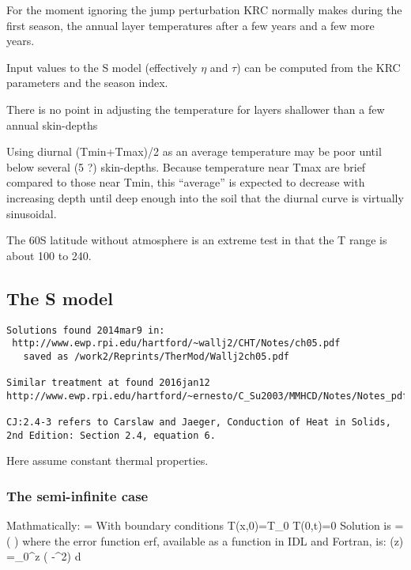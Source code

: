 For the moment ignoring the jump perturbation KRC normally makes during the
first season, the annual layer temperatures after a few years and a few more
years.

Input values to the S model (effectively $\eta$ and $\tau$) can be computed
from the KRC parameters and the season index.

 
There is no point in adjusting the temperature for layers shallower than a few annual skin-depths 

Using diurnal (Tmin+Tmax)/2 as an average temperature may be poor until below
several (5 ?) skin-depths. Because temperature near Tmax are brief compared to
those near Tmin, this ``average'' is expected to decrease with increasing depth
until deep enough into the soil that the diurnal curve is virtually sinusoidal.


The 60S latitude without atmosphere is an extreme test in that the T range is about 100 to 240.



\subsection{The S model}

\vspace{-3.mm} 
\begin{verbatim}
Solutions found 2014mar9 in: 
 http://www.ewp.rpi.edu/hartford/~wallj2/CHT/Notes/ch05.pdf
   saved as /work2/Reprints/TherMod/Wallj2ch05.pdf

Similar treatment at found 2016jan12
http://www.ewp.rpi.edu/hartford/~ernesto/C_Su2003/MMHCD/Notes/Notes_pdf/s02.pdf

CJ:2.4-3 refers to Carslaw and Jaeger, Conduction of Heat in Solids, 2nd Edition: Section 2.4, equation 6.
\end{verbatim}

Here assume constant thermal properties.

\subsubsection{The semi-infinite case} Mathmatically:
\qb {}= \kappa {} \qe
With boundary conditions 
\qb T(x,0)=T_0  T(0,t)=0 \qe
Solution is \qbn {}=  \left(  \right)    where the error function erf, available as a function in IDL and Fortran, is: 
\qb {}(z) =\int_0^z \exp \left( -\xi^2\right) d \xi \qe

